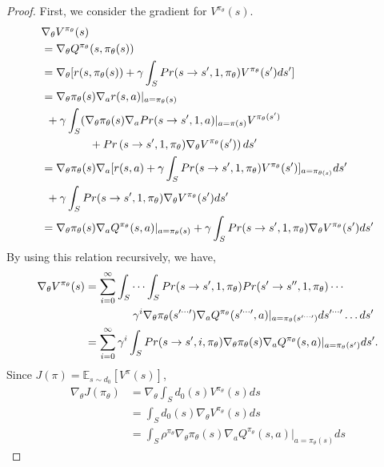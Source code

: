\documentclass[english, dvipdfmx]{ampmt}             %
\newcommand{\expect}{\mathbb{E}}
\begin{document}
\begin{proof}
First, we consider the gradient for $V^{\pi_{\theta}}(s)$.
\begin{align}
	& \nabla_{\theta}V^{\pi_{\theta}}(s) \nonumber \\ 
	&= \nabla_{\theta}Q^{\pi_{\theta}}(s, \pi_{\theta}(s))\nonumber\\
	&= \nabla_{\theta}[r(s,\pi_{\theta}(s))+\gamma\int_{S}Pr(s\to s^{\prime}, 1, \pi_{\theta})V^{\pi_{\theta}}(s^{\prime})ds^{\prime}] \nonumber\\
	&= \nabla_{\theta}\pi_{\theta}(s)\nabla_{a}r(s,a)|_{a=\pi_{\theta}(s)} \nonumber \\
	&\hspace{1ex}+\gamma\int_{S}(\nabla_{\theta}\pi_{\theta}(s)\nabla_aPr(s\to s^{\prime},1,a)|_{a=\pi(s)}V^{\pi_{\theta}(s^{\prime})}\nonumber\\
	&\hspace{10ex}+Pr\left(s\to s^{\prime}, 1, \pi_{\theta})\nabla_{\theta}V^{\pi_{\theta}}(s^{\prime})\right)ds^{\prime}\nonumber\\
	&= \nabla_{\theta}\pi_{\theta}(s)\nabla_a[r(s,a)+\gamma\int_{S}Pr(s\to s^{\prime}, 1, \pi_{\theta})V^{\pi_{\theta}}(s^{\prime})]_{a=\pi_{\theta(s)}}ds^{\prime} \nonumber \\
	&\hspace{1ex}+\gamma\int_{S}Pr(s\to s^{\prime}, 1, \pi_{\theta})\nabla_{\theta}V^{\pi_{\theta}}(s^{\prime})ds^{\prime}\nonumber\\
	&= \nabla_{\theta}\pi_{\theta}(s)\nabla_aQ^{\pi_{\theta}}(s,a)|_{a=\pi_{\theta}(s)} + \gamma\int_{S}Pr(s\to s^{\prime}, 1, \pi_{\theta})\nabla_{\theta}V^{\pi_{\theta}}(s^{\prime})ds^{\prime}
\end{align}
By using this relation recursively, we have,
\begin{align}
	\nabla_{\theta}V^{\pi_{\theta}}(s) &= \sum_{i=0}^{\infty}\int_{S}\cdots\int_{S}Pr(s\to s^{\prime},1,\pi_{\theta})Pr(s^{\prime}\to s^{\prime\prime},1,\pi_{\theta})\cdots\nonumber\\
	&\hspace{10ex}\gamma^i\nabla_{\theta}\pi_{\theta}(s^{\prime\cdots\prime})\nabla_aQ^{\pi_{\theta}}(s^{\prime\cdots\prime},a)|_{a=\pi_{\theta}(s^{\prime\cdots\prime})}ds^{\prime\cdots\prime}\ldots ds^{\prime}\nonumber\\
	&= \sum_{i=0}^{\infty} \gamma^i\int_{S}Pr(s\to s^{\prime}, i, \pi_{\theta})\nabla_{\theta}\pi_{\theta}(s)\nabla_aQ^{\pi_{\theta}}(s,a)|_{a=\pi_{\theta}(s^{\prime})}ds^{\prime}.\label{multiple_integral}
\end{align}
Since $J(\pi) = \expect_{s\sim d_0}[V^{\pi}(s)]$, 
\begin{align}
	\nabla_{\theta}J(\pi_{\theta}) &= \nabla_{\theta}\int_{S}d_0(s)V^{\pi_{\theta}}(s)ds \nonumber\\
	&= \int_{S}d_0(s)\nabla_{\theta}V^{\pi_{\theta}}(s)ds \nonumber\\
	&= \int_{S}\rho^{\pi_{\theta}}\nabla_{\theta}\pi_{\theta}(s)\nabla_aQ^{\pi_{\theta}}(s,a)|_{a=\pi_{\theta}(s)}ds
\end{align}
\end{proof}
\end{document}
